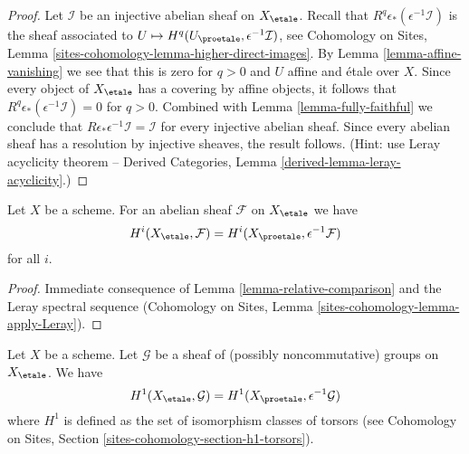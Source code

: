 \begin{proof}
Let $\mathcal{I}$ be an injective abelian sheaf on $X_\etale$.
Recall that $R^q\epsilon_*(\epsilon^{-1}\mathcal{I})$ is the sheaf associated
to $U \mapsto H^q(U_\proetale, \epsilon^{-1}\mathcal{I})$, see
Cohomology on Sites, Lemma \ref{sites-cohomology-lemma-higher-direct-images}.
By Lemma \ref{lemma-affine-vanishing} we see that this is zero for $q > 0$
and $U$ affine and \'etale over $X$. Since every object of
$X_\etale$ has a covering by affine objects, it follows that
$R^q\epsilon_*(\epsilon^{-1}\mathcal{I}) = 0$ for $q > 0$.
Combined with Lemma \ref{lemma-fully-faithful} we conclude that
$R\epsilon_*\epsilon^{-1}\mathcal{I} = \mathcal{I}$
for every injective abelian sheaf. Since every abelian
sheaf has a resolution by injective sheaves, the result follows.
(Hint: use Leray acyclicity theorem -- Derived Categories, Lemma
\ref{derived-lemma-leray-acyclicity}.)
\end{proof}

\begin{lemma}
\label{lemma-compare-cohomology}
Let $X$ be a scheme. For an abelian sheaf $\mathcal{F}$ on $X_\etale$
we have
$$
H^i(X_\etale, \mathcal{F}) =
H^i(X_\proetale, \epsilon^{-1}\mathcal{F})
$$
for all $i$.
\end{lemma}

\begin{proof}
Immediate consequence of Lemma \ref{lemma-relative-comparison} and
the Leray spectral sequence (Cohomology on Sites, Lemma
\ref{sites-cohomology-lemma-apply-Leray}).
\end{proof}

\begin{lemma}
\label{lemma-compare-cohomology-nonabelian}
Let $X$ be a scheme. Let $\mathcal{G}$ be a sheaf of (possibly
noncommutative) groups on $X_\etale$. We have
$$
H^1(X_\etale, \mathcal{G}) =
H^1(X_\proetale, \epsilon^{-1}\mathcal{G})
$$
where $H^1$ is defined as the set of isomorphism classes of
torsors (see
Cohomology on Sites, Section \ref{sites-cohomology-section-h1-torsors}).
\end{lemma}

